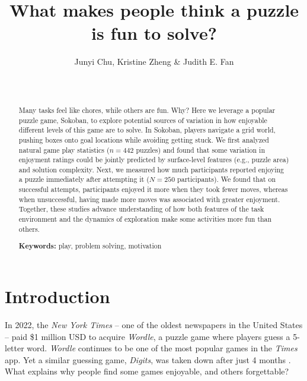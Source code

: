 \documentclass[10pt,letterpaper]{article}
\title{What makes people think a puzzle is fun to solve?}
\author{%
{\large Junyi Chu, Kristine Zheng \& Judith E. Fan}\\
\affaddr{Department of Psychology}\\
\affaddr{Stanford University, United States}\\
\email{\{junyichu,kxzheng,jefan\}@stanford.edu}
}
\begin{document}


\maketitle


\begin{abstract}

Many tasks feel like chores, while others are fun. Why? 
Here we leverage a popular puzzle game, Sokoban, to explore potential sources of variation in how enjoyable different levels of this game are to solve. 
In Sokoban, players navigate a grid world, pushing boxes onto goal locations while avoiding getting stuck.  
We first analyzed natural game play statistics ($n=442$ puzzles) and found that some variation in enjoyment ratings could be jointly predicted by surface-level features (e.g., puzzle area) and solution complexity. 
Next, we measured how much participants reported enjoying a puzzle immediately after attempting it ($N=250$ participants).
We found that on successful attempts, participants enjoyed it more when they took fewer moves, whereas when unsuccessful, having made more moves was associated with greater enjoyment.
Together, these studies advance understanding of how both features of the task environment and the dynamics of exploration make some activities more fun than others.
    
\textbf{Keywords:} play, problem solving, motivation
\end{abstract}

\section{Introduction}
In 2022, the \textit{New York Times} -- one of the oldest newspapers in the United States -- paid \$1 million USD to acquire \textit{Wordle}, a puzzle game where players guess a 5-letter word. 
\textit{Wordle} continues to be one of the most popular games in the \textit{Times} app. 
Yet a similar guessing game, \textit{Digits}, was taken down after just 4 months \cite{Amlen.2023}.   
What explains why people find some games enjoyable, and others forgettable?
\end{document}
